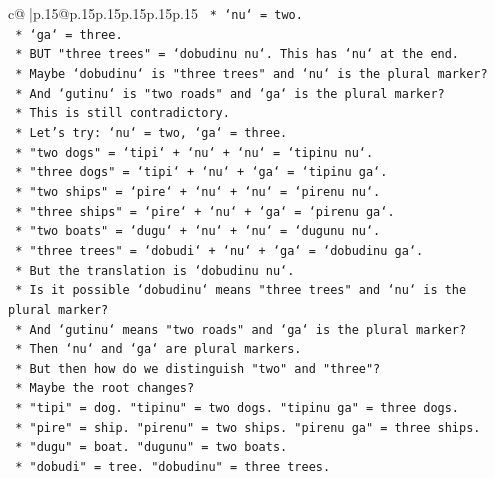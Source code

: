 \documentclass{article}
\begin{document}
{\begin{supertabular}{c@{$\;$}|p{.15\linewidth}@{}p{.15\linewidth}p{.15\linewidth}p{.15\linewidth}p{.15\linewidth}p{.15\linewidth}}
{{{\texttt{                *   `nu` = two.} \\
\texttt{                *   `ga` = three.} \\
\texttt{                *   BUT "three trees" = `dobudinu nu`. This has `nu` at the end.} \\
\texttt{                *   Maybe `dobudinu` is "three trees" and `nu` is the plural marker?} \\
\texttt{                *   And `gutinu` is "two roads" and `ga` is the plural marker?} \\
\texttt{                *   This is still contradictory.} \\
\texttt{            *   Let's try: `nu` = two, `ga` = three.} \\
\texttt{            *   "two dogs" = `tipi` + `nu` + `nu` = `tipinu nu`.} \\
\texttt{            *   "three dogs" = `tipi` + `nu` + `ga` = `tipinu ga`.} \\
\texttt{            *   "two ships" = `pire` + `nu` + `nu` = `pirenu nu`.} \\
\texttt{            *   "three ships" = `pire` + `nu` + `ga` = `pirenu ga`.} \\
\texttt{            *   "two boats" = `dugu` + `nu` + `nu` = `dugunu nu`.} \\
\texttt{            *   "three trees" = `dobudi` + `nu` + `ga` = `dobudinu ga`.} \\
\texttt{            *   But the translation is `dobudinu nu`.} \\
\texttt{            *   Is it possible `dobudinu` means "three trees" and `nu` is the plural marker?} \\
\texttt{            *   And `gutinu` means "two roads" and `ga` is the plural marker?} \\
\texttt{            *   Then `nu` and `ga` are plural markers.} \\
\texttt{            *   But then how do we distinguish "two" and "three"?} \\
\texttt{            *   Maybe the root changes?} \\
\texttt{            *   "tipi" = dog. "tipinu" = two dogs. "tipinu ga" = three dogs.} \\
\texttt{            *   "pire" = ship. "pirenu" = two ships. "pirenu ga" = three ships.} \\
\texttt{            *   "dugu" = boat. "dugunu" = two boats.} \\
\texttt{            *   "dobudi" = tree. "dobudinu" = three trees.} \\
}}}
\end{supertabular}}
\end{document}
